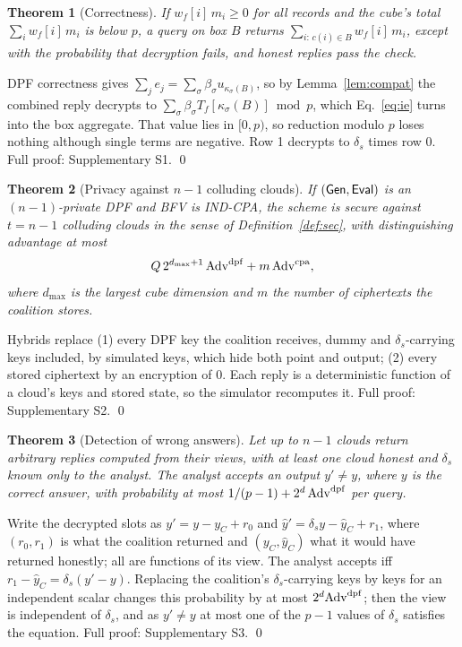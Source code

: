 \documentclass[a4paper,fleqn]{cas-sc}
\newtheorem{theorem}{Theorem}
\begin{document}
\begin{theorem}[Correctness]
\label{thm:correct}
If $w_f[i]\,m_i\ge0$ for all records and the cube's total
$\sum_iw_f[i]\,m_i$ is below $p$, a query on box $B$ returns
$\sum_{i:\,c(i)\in B}w_f[i]\,m_i$, except with the probability that decryption
fails, and honest replies pass the check.
\end{theorem}
\begin{pf}
DPF correctness gives $\sum_je_j=\sum_\sigma\beta_\sigma u_{\kappa_\sigma(B)}$,
so by Lemma~\ref{lem:compat} the combined reply decrypts to
$\sum_\sigma\beta_\sigma T_f[\kappa_\sigma(B)]\bmod p$, which
Eq.~\eqref{eq:ie} turns into the box aggregate. That value lies in $[0,p)$,
so reduction modulo $p$ loses nothing although single terms are negative.
Row 1 decrypts to $\delta_s$ times row 0. Full proof: Supplementary S1. \qed
\end{pf}

\begin{theorem}[Privacy against $n-1$ colluding clouds]
\label{thm:sec}
If $(\mathsf{Gen},\mathsf{Eval})$ is an $(n{-}1)$-private DPF and BFV is IND-CPA, the scheme is
secure against $t=n-1$ colluding clouds in the sense of
Definition~\ref{def:sec}, with distinguishing advantage at most
\[
Q\,2^{d_{\max}+1}\,\mathrm{Adv}^{\mathrm{dpf}}+m\,\mathrm{Adv}^{\mathrm{cpa}} ,
\]
where $d_{\max}$ is the largest cube dimension and $m$ the number of ciphertexts
the coalition stores.
\end{theorem}
\begin{pf}
Hybrids replace (1) every DPF key the coalition receives, dummy and
$\delta_s$-carrying keys included, by simulated keys, which hide both point
and output; (2) every stored ciphertext by an encryption of $0$. Each reply is
a deterministic function of a cloud's keys and stored state, so the simulator
recomputes it. Full proof: Supplementary S2. \qed
\end{pf}

\begin{theorem}[Detection of wrong answers]
\label{thm:tamper}
Let up to $n-1$ clouds return arbitrary replies computed from their views,
with at least one cloud honest and $\delta_s$ known only to the analyst. The
analyst accepts an output $y'\neq y$, where $y$ is the correct answer, with
probability at most $1/(p-1)+2^d\,\mathrm{Adv}^{\mathrm{dpf}}$ per query.
\end{theorem}
\begin{pf}
Write the decrypted slots as $y'=y-y_C+r_0$ and
$\hat y'=\delta_sy-\hat y_C+r_1$, where $(r_0,r_1)$ is what the coalition
returned and $(y_C,\hat y_C)$ what it would have returned honestly; all are
functions of its view. The analyst accepts iff
$r_1-\hat y_C=\delta_s(y'-y)$. Replacing the coalition's $\delta_s$-carrying
keys by keys for an independent scalar changes this probability by at most
$2^d\mathrm{Adv}^{\mathrm{dpf}}$; then the view is independent of $\delta_s$, and as $y'\neq y$ at
most one of the $p-1$ values of $\delta_s$ satisfies the equation. Full proof:
Supplementary S3. \qed
\end{pf}
\end{document}
